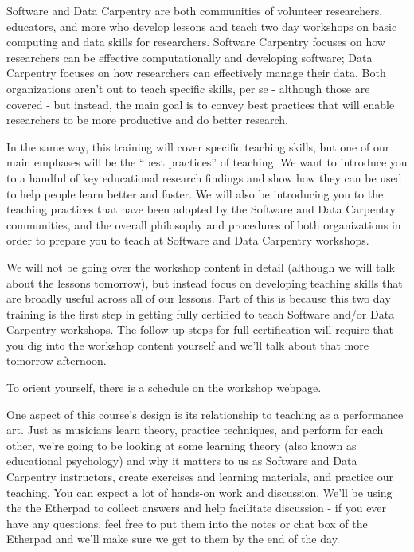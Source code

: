 Software and Data Carpentry are
both communities of volunteer researchers, educators, and more who develop
lessons and teach two day workshops on basic computing and data skills for
researchers.  Software Carpentry focuses on how researchers can be effective
computationally and developing software; Data Carpentry focuses on how
researchers can effectively manage their data.
Both organizations aren't out to teach specific skills, per se - although those
are covered - but instead, the main goal is to convey best practices that will enable
researchers to be more productive and do better research.

In the same way, this training will cover specific teaching skills, but
one of our main emphases will be the ``best practices'' of teaching.  We
want to introduce you to a handful of key educational research
findings and show how they can be used to help people learn better
and faster.  We will also
be introducing you to the teaching practices that have been
adopted by the Software and Data Carpentry communities, and the
overall philosophy and procedures of both organizations in order
to prepare you to teach at Software and Data Carpentry workshops.

We will not be going
over the workshop content in detail (although we will talk about
the lessons tomorrow), but instead
focus on developing teaching skills that are broadly
useful across all of our lessons.  Part of this is because
this two day training is the first step in getting fully certified
to teach Software and/or Data Carpentry workshops.
The follow-up steps for full certification will require that you dig into the workshop
content yourself and we'll talk about that more tomorrow afternoon.

To orient yourself, there is a schedule on the workshop webpage.

One aspect of this course's design is its relationship to teaching
as a performance art.  Just as musicians learn theory, practice techniques,
and perform for each other, we're going to be looking at some learning
theory (also known as educational psychology) and why it matters to us
as Software and Data Carpentry instructors, create exercises and learning
materials, and practice our teaching.  You can expect a lot of
hands-on work and discussion.  We'll be using the the Etherpad to collect
answers and help facilitate discussion - if you ever have any questions,
feel free to put them into the notes or chat box of the Etherpad and we'll
make sure we get to them by the end of the day.


